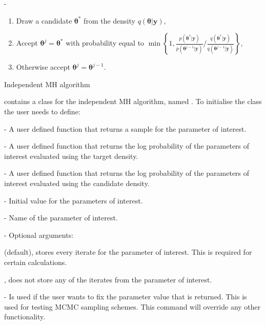 -\documentclass[article]{jss}
\begin{document}
%
\begin{algorithm}[H]
\begin{enumerate}
\item Draw a candidate $\bm{\bm{\theta}}^{\ast}$ from the density $q\left(\bm{\bm{\theta}}|\bm{y}\right),$ 
\item Accept $\bm{\theta}^{j}=\bm{\theta}^{\ast}$ with probability equal
to $\min\left\{ 1,\frac{p\left(\bm{\theta}^{\ast}|\bm{y}\right)}{p\left(\bm{\theta}^{j-1}|\bm{y}\right)}/\frac{q\left(\bm{\theta}^{\ast}|\bm{y}\right)}{q\left(\bm{\theta}^{j-1}|\bm{y}\right)}\right\} ,$ 
\item Otherwise accept $\bm{\theta}^{j}=\bm{\theta}^{j-1}.$ 
\end{enumerate}
\caption{Independent MH algorithm}
\label{alg:IMH}
\end{algorithm}


 contains a class for the independent MH algorithm, named
.  To initialise the class the user needs to define:
\begin{description}
\item {} - A user defined function that returns a sample for
  the parameter of interest.
\item {} - A user defined function that returns the log
  probability of the parameters of interest evaluated using the target
  density.
\item {} - A user defined function that returns the log
  probability of the parameters of interest evaluated using the
  candidate density.
\item {} - Initial value for the parameters of interest.
\item {} - Name of the parameter of interest.
\item {}- Optional arguments:

\begin{description}
\item {}
  \begin{description}
  \item {} (default), stores every iterate for the parameter
    of interest. This is required for certain calculations.
  \item {}, does not store any of the iterates from the parameter
    of interest.
  \end{description}
\item {} - Is used if the user wants to fix the
    parameter value that is returned. This is used for testing MCMC
    sampling schemes.  This command will override any other
    functionality.
  \end{description}
\end{description}
\end{document}
